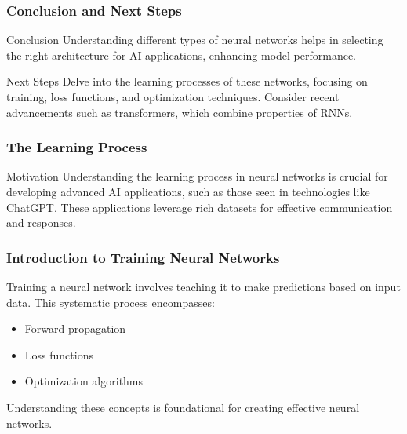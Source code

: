 \documentclass[aspectratio=169]{beamer}
\begin{document}
\begin{frame}[fragile]
    \frametitle{Conclusion and Next Steps}
    \begin{block}{Conclusion}
        Understanding different types of neural networks helps in selecting the right architecture for AI applications, enhancing model performance.
    \end{block}
    \begin{block}{Next Steps}
        Delve into the learning processes of these networks, focusing on training, loss functions, and optimization techniques. 
        Consider recent advancements such as transformers, which combine properties of RNNs.
    \end{block}
\end{frame}

\begin{frame}[fragile]
    \frametitle{The Learning Process}
    \begin{block}{Motivation}
        Understanding the learning process in neural networks is crucial for developing advanced AI applications, such as those seen in technologies like ChatGPT. These applications leverage rich datasets for effective communication and responses.
    \end{block}
\end{frame}

\begin{frame}[fragile]
    \frametitle{Introduction to Training Neural Networks}
    Training a neural network involves teaching it to make predictions based on input data. This systematic process encompasses:
    \begin{itemize}
        \item Forward propagation
        \item Loss functions
        \item Optimization algorithms
    \end{itemize}
    Understanding these concepts is foundational for creating effective neural networks.
\end{frame}
\end{document}
